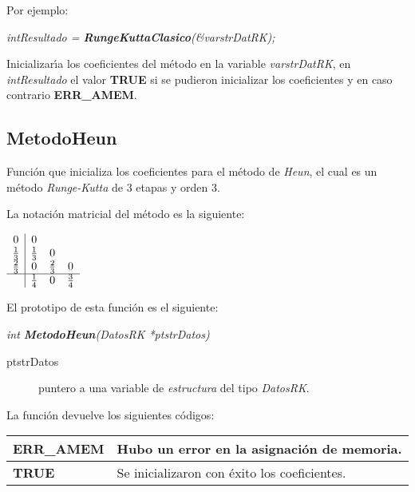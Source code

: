 Por ejemplo:

\begin{center}
\emph{intResultado = \textbf{RungeKuttaClasico}(\&varstrDatRK);}
\end{center}

Inicializar\'{\i}a los coeficientes del m\'etodo en la variable 
\emph{varstrDatRK}, en \emph{intResultado} el valor \textbf{TRUE} si se pudieron
inicializar los coeficientes y en caso contrario \textbf{ERR\_AMEM}.

\subsection{MetodoHeun}
Funci\'on que inicializa los coeficientes para el m\'etodo de \emph{Heun}, el
cual es un m\'etodo \emph{Runge-Kutta} de $3$ etapas y orden $3$.\newline

La notaci\'on matricial del m\'etodo es la siguiente:

\begin{center}
$
\begin{array}{c|ccc}
0 & 0 \\
\frac{1}{3} & \frac{1}{3} & 0 \\
\frac{2}{3} & 0 & \frac{2}{3} & 0 \\
\hline
 & \frac{1}{4} & 0 & \frac{3}{4}
\end{array}
$
\end{center}

El prototipo de esta funci\'on es el siguiente:

\begin{center}
\emph{int \textbf{MetodoHeun}(DatosRK *ptstrDatos)}
\end{center}

\begin{description}
\item[ptstrDatos] puntero a una variable de \emph{estructura} del tipo
\emph{DatosRK}.
\end{description}

La funci\'on devuelve los siguientes c\'odigos:

\begin{center}
\begin{tabular}{|l|l|}
\hline
\textbf{ERR\_AMEM} & Hubo un error en la asignaci\'on de memoria. \\
\hline
\textbf{TRUE} & Se inicializaron con \'exito los coeficientes. \\
\hline
\end{tabular}
\end{center}

